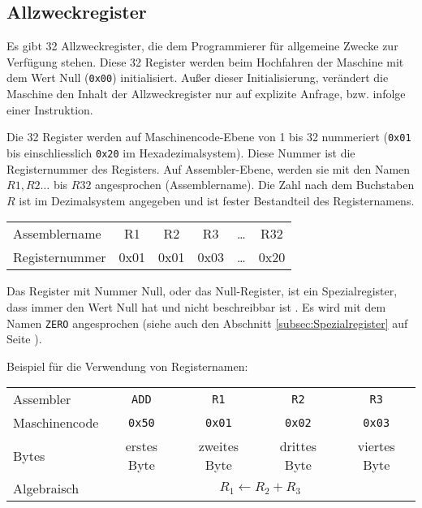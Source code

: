\subsection{Allzweckregister}

Es gibt 32 Allzweckregister, die dem Programmierer für allgemeine Zwecke zur
Verfügung stehen. Diese 32 Register werden beim Hochfahren der Maschine mit dem
Wert Null (\texttt{0x00}) initialisiert. Außer dieser Initialisierung, verändert
die Maschine den Inhalt der Allzweckregister nur auf explizite Anfrage, bzw.
infolge einer Instruktion. 

Die 32 Register werden auf Maschinencode-Ebene von 1 bis 32 nummeriert
(\texttt{0x01} bis einschliesslich \texttt{0x20} im Hexadezimalsystem). Diese
Nummer ist die \gls{Registernummer} des Registers. Auf Assembler-Ebene, werden
sie mit den Namen $R1, R2\dots$ bis $R32$ angesprochen (Assemblername). Die Zahl
nach dem Buchstaben $R$ ist im Dezimalsystem angegeben und ist fester
Bestandteil des Registernamens.

\begin{center}
  \begin{tabular}{l||*{5}{T|}}
    Assemblername  & R1   & R2   & R3   & \dots & R32 \\
    Registernummer & 0x01 & 0x01 & 0x03 & \dots & 0x20
  \end{tabular}
\end{center}

Das Register mit Nummer Null, oder das
Null-Register, ist ein
Spezialregister, dass immer den Wert Null hat und nicht beschreibbar ist . Es
wird mit dem Namen \texttt{ZERO} angesprochen (siehe auch den Abschnitt
\ref{subsec:Spezialregister} auf Seite \pageref{subsec:Spezialregister}).

Beispiel für die Verwendung von Registernamen:
\begin{center}
  \begin{tabular}{|l||*{4}{c|}}                                       \hline
    Assembler     & \texttt{ADD}  & \texttt{R1}   & \texttt{R2}   &
                    \texttt{R3}                                      \\
    Maschinencode & \texttt{0x50} & \texttt{0x01} & \texttt{0x02} &
                    \texttt{0x03}                                    \\\hline
    Bytes         & erstes Byte   & zweites Byte  & drittes Byte  & 
                    viertes Byte                                     \\\hline
    Algebraisch   & \multicolumn{4}{c|}{$R_{1} \gets R_{2} + R_{3}$} \\\hline
  \end{tabular}
\end{center}


